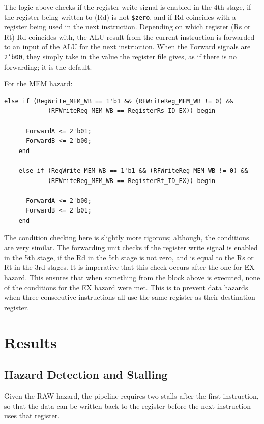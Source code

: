 \documentclass[twocolumn]{article}
\newcommand{\cc}[1]{\texttt{#1}}
\begin{document}
The logic above checks if the register write signal is enabled in the 4th stage, if the register being written to (Rd) is not \cc{\$zero}, and if Rd coincides with a register being used in the next instruction. Depending on which register (Rs or Rt) Rd coincides with, the ALU result from the current instruction is forwarded to an input of the ALU for the next instruction. When the Forward signals are \cc{2'b00}, they simply take in the value the register file gives, as if there is no forwarding; it is the default. \\

\newpage

For the MEM hazard:

\begin{lstlisting}[escapechar=@]
    else if (RegWrite_MEM_WB == 1'b1 && (RFWriteReg_MEM_WB != 0) &&
            (RFWriteReg_MEM_WB == RegisterRs_ID_EX)) begin

      ForwardA <= 2'b01;
      ForwardB <= 2'b00;
    end

    else if (RegWrite_MEM_WB == 1'b1 && (RFWriteReg_MEM_WB != 0) &&
            (RFWriteReg_MEM_WB == RegisterRt_ID_EX)) begin

      ForwardA <= 2'b00;
      ForwardB <= 2'b01;
    end
\end{lstlisting}
\medskip

The condition checking here is slightly more rigorous; although, the conditions are very similar. The forwarding unit checks if the register write signal is enabled in the 5th stage, if the Rd in the 5th stage is not zero, and is equal to the Rs or Rt in the 3rd stages. It is imperative that this check occurs after the one for EX hazard. This ensures that when something from the block above is executed, none of the conditions for the EX hazard were met. This is to prevent data hazards when three consecutive instructions all use the same register as their destination register. \\

\section{Results}


\subsection{Hazard Detection and Stalling}

Given the RAW hazard, the pipeline requires two stalls after the first instruction, so that the data can be written back to the register before the next instruction uses that register. \\
\end{document}
